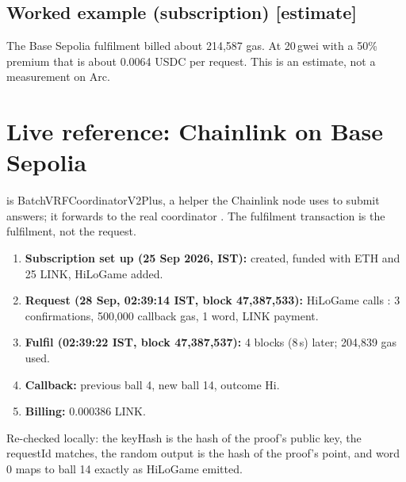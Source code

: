 \documentclass[11pt,a4paper]{article}
\begin{document}
\subsection{Worked example (subscription) [estimate]}
The Base Sepolia fulfilment billed about 214{,}587 gas. At 20\,gwei with a 50\% premium that is about 0.0064 USDC per request. This is an estimate, not a measurement on Arc.

\section{Live reference: Chainlink on Base Sepolia}
 \cite{bsbatch} is BatchVRFCoordinatorV2Plus, a helper the Chainlink node uses to submit answers; it forwards to the real coordinator  \cite{bscoord}. The fulfilment transaction \cite{bsfulfil} is the fulfilment, not the request.

\begin{enumerate}[label=\textbf{\arabic*.}]
  \item \textbf{Subscription set up (25 Sep 2026, IST):} created, funded with ETH and 25 LINK, HiLoGame added.
  \item \textbf{Request (28 Sep, 02:39:14 IST, block 47,387,533):} HiLoGame calls : 3 confirmations, 500,000 callback gas, 1 word, LINK payment.
  \item \textbf{Fulfil (02:39:22 IST, block 47,387,537):} 4 blocks (8\,s) later; 204,839 gas used.
  \item \textbf{Callback:} previous ball 4, new ball 14, outcome Hi.
  \item \textbf{Billing:} 0.000386 LINK.
\end{enumerate}
Re-checked locally: the keyHash is the hash of the proof's public key, the requestId matches, the random output is the hash of the proof's point, and word 0 maps to ball 14 exactly as HiLoGame emitted.
\end{document}
